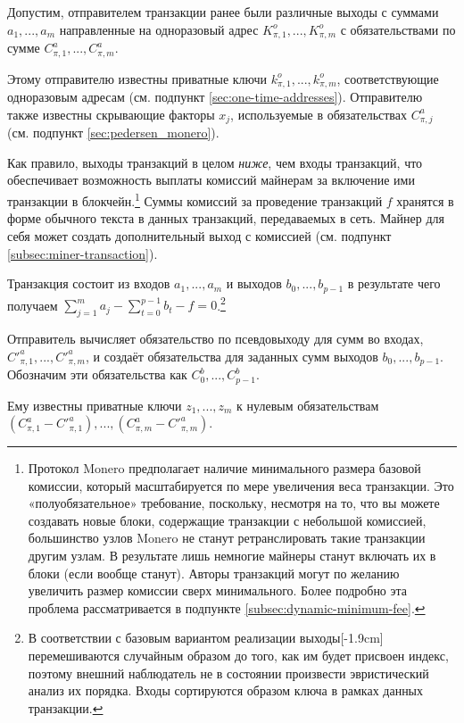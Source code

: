 Допустим, отправителем транзакции ранее были различные выходы с суммами $a_1, ..., a_m$ направленные на одноразовый адрес $K^o_{\pi,1}, ..., K^o_{\pi,m}$ с обязательствами по сумме $C^a_{\pi,1}, ..., C^a_{\pi,m}$.

Этому отправителю известны приватные ключи $k^o_{\pi,1}, ..., k^o_{\pi,m}$, соответствующие одноразовым адресам (см. подпункт \ref{sec:one-time-addresses}). Отправителю также известны скрывающие факторы $x_j$, исполь\-зуемые в обязательствах $C^a_{\pi,j}$ (см. подпункт \ref{sec:pedersen_monero}).

Как правило, выходы транзакций в целом {\em ниже}, чем входы транзакций, что обеспечивает возможность выплаты комиссий майнерам за включение ими транзакции в блокчейн.\footnote{Протокол Monero предполагает наличие минимального размера базовой комиссии, который масштабируется по мере увеличения веса транзакции. Это «полуобязательное»  требование, поскольку, несмотря на то, что вы можете создавать новые блоки, содержащие транзакции с небольшой комиссией, большинство узлов Monero не станут ретранслировать такие транзакции другим узлам. В результате лишь немногие майнеры станут включать их в блоки (если вообще станут). Авторы транзакций могут по желанию увеличить размер комиссии сверх минимального. Более подробно эта проблема рассматривается в подпункте \ref{subsec:dynamic-minimum-fee}.} Суммы комиссий за проведение транзакций $f$ хранятся в форме обычного текста в данных транзакций, передаваемых в сеть. Майнер для себя может создать дополнительный выход с комиссией (см. подпункт \ref{subsec:miner-transaction}).

Транзакция состоит из входов \(a_1, ..., a_m\) и выходов \(b_0, ..., b_{p-1}\) в результате чего получаем \(\sum\limits_{j=1}^m a_j - \sum\limits_{t=0}^{p-1} b_t - f = 0\).\footnote{В соответствии с базовым вариантом реализации выходы[-1.9cm] перемешиваются случайным образом до того, как им будет присвоен индекс, поэтому внешний наблюдатель не в состоянии произвести эвристический анализ их порядка. Входы сортируются образом ключа в рамках данных транзакции.}

Отправитель вычисляет обязательство по псевдовыходу для сумм во входах, $C'^a_{\pi,1}, ..., C'^a_{\pi,m}$, и создаёт обязательства для заданных сумм выходов $b_0, ..., b_{p-1}$. Обозначим эти обязательства как $C^b_0, ..., C^b_{p-1}$.

Ему известны приватные ключи $z_1,...,z_m$ к нулевым обязательствам $(C^a_{\pi,1} - C'^a_{\pi,1}),...,(C^a_{\pi,m} - C'^a_{\pi,m})$.

